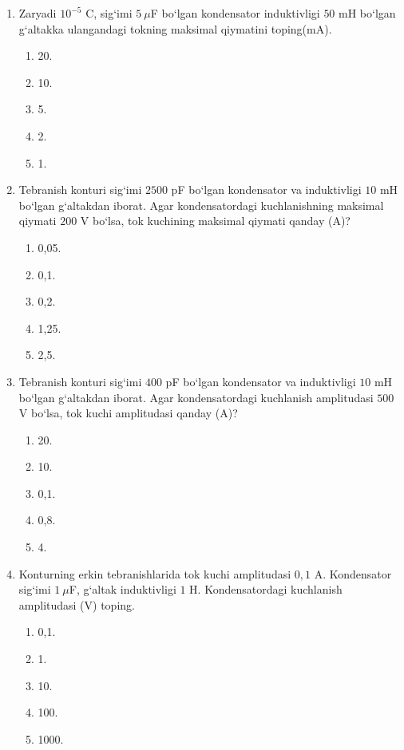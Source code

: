 \begin{enumerate}
\item Zaryadi $10^{-5}$ C, sig‘imi $5~\mu$F bo‘lgan kondensator induktivligi $50$ mH bo‘lgan g‘altakka ulangandagi tokning maksimal qiymatini toping(mA).
\begin{enumerate}[label=\Alph*)]
\item 20.
\item 10.
\item 5.
\item 2.
\item 1.
\end{enumerate}

\item Tebranish konturi sig‘imi $2500$ pF bo‘lgan kondensator va induktivligi $10$ mH bo‘lgan g‘altakdan iborat. Agar kondensatordagi kuchlanishning maksimal qiymati $200$ V bo‘lsa, tok kuchining maksimal qiymati qanday (A)?
\begin{enumerate}[label=\Alph*)]
\item 0,05.
\item 0,1.
\item 0,2.
\item 1,25.
\item 2,5.
\end{enumerate}

\item Tebranish konturi sig‘imi $400$ pF bo‘lgan kondensator va induktivligi $10$ mH bo‘lgan g‘altakdan iborat. Agar kondensatordagi kuchlanish amplitudasi $500$ V bo‘lsa, tok kuchi amplitudasi qanday (A)?
\begin{enumerate}[label=\Alph*)]
\item 20.
\item 10.
\item 0,1.
\item 0,8.
\item 4.
\end{enumerate}

\item Konturning erkin tebranishlarida tok kuchi amplitudasi $0,1$ A. Kondensator sig‘imi $1~\mu$F, g‘altak induktivligi $1$ H. Kondensatordagi kuchlanish amplitudasi (V) toping.
\begin{enumerate}[label=\Alph*)]
\item 0,1.
\item 1.
\item 10.
\item 100.
\item 1000.
\end{enumerate}


\end{enumerate}
